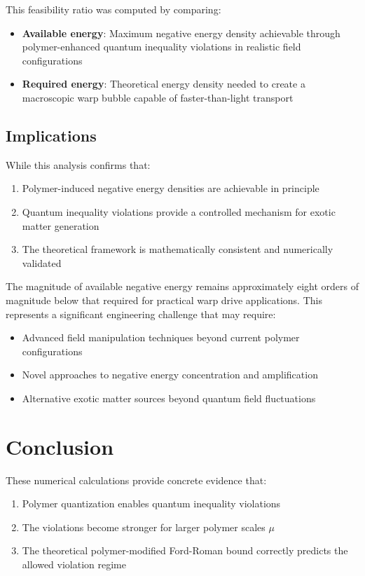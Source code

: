 \documentclass[11pt]{article}
\begin{document}
This feasibility ratio was computed by comparing:
\begin{itemize}
\item \textbf{Available energy}: Maximum negative energy density achievable through polymer-enhanced quantum inequality violations in realistic field configurations
\item \textbf{Required energy}: Theoretical energy density needed to create a macroscopic warp bubble capable of faster-than-light transport
\end{itemize}

\subsection{Implications}
While this analysis confirms that:
\begin{enumerate}
\item Polymer-induced negative energy densities are achievable in principle
\item Quantum inequality violations provide a controlled mechanism for exotic matter generation
\item The theoretical framework is mathematically consistent and numerically validated
\end{enumerate}

The magnitude of available negative energy remains approximately eight orders of magnitude below that required for practical warp drive applications. This represents a significant engineering challenge that may require:
\begin{itemize}
\item Advanced field manipulation techniques beyond current polymer configurations
\item Novel approaches to negative energy concentration and amplification
\item Alternative exotic matter sources beyond quantum field fluctuations
\end{itemize}

\section{Conclusion}

These numerical calculations provide concrete evidence that:

\begin{enumerate}
\item Polymer quantization enables quantum inequality violations
\item The violations become stronger for larger polymer scales $\mu$
\item The theoretical polymer-modified Ford-Roman bound correctly predicts the allowed violation regime
\end{enumerate}
\end{document}
